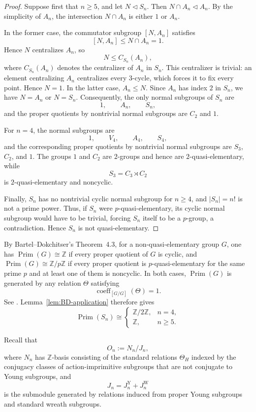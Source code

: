 \documentclass[a4paper,11pt]{article}
\numberwithin{equation}{section}
\newcommand{\Z}{\mathbb{Z}}
\newcommand{\Prim}{\operatorname{Prim}}
\newcommand{\coeff}{\operatorname{coeff}}
\begin{document}
\begin{proof}
Suppose first that $n\ge5$, and let $N\triangleleft S_n$. Then
$N\cap A_n\triangleleft A_n$. By the simplicity of $A_n$, the intersection
$N\cap A_n$ is either $1$ or $A_n$.

In the former case, the commutator subgroup $[N,A_n]$ satisfies
\[
  [N,A_n]\le N\cap A_n=1.
\]
Hence $N$ centralizes $A_n$, so
\[
  N\le C_{S_n}(A_n),
\]
where $C_{S_n}(A_n)$ denotes the centralizer of $A_n$ in $S_n$. This
centralizer is trivial: an element centralizing $A_n$ centralizes every
$3$-cycle, which forces it to fix every point. Hence $N=1$. In the latter
case, $A_n\le N$. Since $A_n$ has
index $2$ in $S_n$, we have $N=A_n$ or $N=S_n$. Consequently, the only
normal subgroups of $S_n$ are
\[
  1,\qquad A_n,\qquad S_n,
\]
and the proper quotients by nontrivial normal subgroups are $C_2$ and $1$.

For $n=4$, the normal subgroups are
\[
  1,\qquad V_4,\qquad A_4,\qquad S_4,
\]
and the corresponding proper quotients by nontrivial normal subgroups are
$S_3$, $C_2$, and $1$. The groups $1$ and $C_2$ are $2$-groups and hence
are $2$-quasi-elementary, while
\[
  S_3=C_3\rtimes C_2
\]
is $2$-quasi-elementary and noncyclic.

Finally, $S_n$ has no nontrivial cyclic normal subgroup for $n\ge4$, and
$|S_n|=n!$ is not a prime power. Thus, if $S_n$ were $p$-quasi-elementary,
its cyclic normal subgroup would have to be trivial, forcing $S_n$ itself to
be a $p$-group, a contradiction. Hence $S_n$ is not quasi-elementary.
\end{proof}

By Bartel--Dokchitser's Theorem~4.3, for a non-quasi-elementary group
$G$, one has $\Prim(G)\cong\Z$ if every proper quotient of $G$ is cyclic, and
$\Prim(G)\cong\Z/p\Z$ if every proper quotient is $p$-quasi-elementary for
the same prime $p$ and at least one of them is noncyclic. In both cases,
$\Prim(G)$ is generated by any relation $\Theta$ satisfying
\[
  \coeff_{[G/G]}(\Theta)=1.
\]
See \cite[Theorem~4.3]{BartelDokchitserBrauer}. Lemma~\ref{lem:BD-application}
therefore gives
\begin{equation}\label{eq:BD-values}
  \Prim(S_n)\cong
  \begin{cases}
    \Z/2\Z,&n=4,\\
    \Z,&n\ge5.
  \end{cases}
\end{equation}

Recall that
\[
  O_n:=N_n/J_n,
\]
where $N_n$ has $\Z$-basis consisting of the standard relations $\Theta_H$
indexed by the conjugacy classes of action-imprimitive subgroups that are not
conjugate to Young subgroups, and
\[
  J_n=J_n^{\mathrm Y}+J_n^{\mathrm W}
\]
is the submodule generated by relations induced from proper Young subgroups
and standard wreath subgroups.
\end{document}

